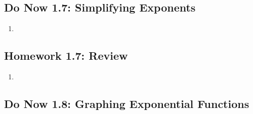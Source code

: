 \documentclass[12pt, oneside]{article}
\begin{document}
\newpage
\subsection*{Do Now 1.7: Simplifying Exponents}
\begin{enumerate}
  \item
\end{enumerate}


\newpage
\subsection*{Homework 1.7: Review}
\begin{enumerate}
  \item
\end{enumerate}


\newpage
\subsection*{Do Now 1.8: Graphing Exponential Functions}
\end{document}
